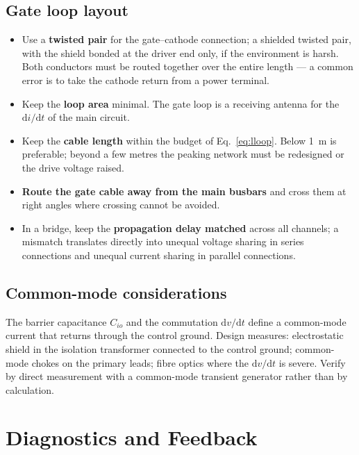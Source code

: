 \documentclass[11pt,a4paper]{article}
\begin{document}
\subsection{Gate loop layout}

\begin{itemize}
  \item Use a \textbf{twisted pair} for the gate--cathode connection; a shielded
        twisted pair, with the shield bonded at the driver end only, if the
        environment is harsh. Both conductors must be routed together over the
        entire length --- a common error is to take the cathode return from a power
        terminal.
  \item Keep the \textbf{loop area} minimal. The gate loop is a receiving antenna
        for the $\mathrm{d}i/\mathrm{d}t$ of the main circuit.
  \item Keep the \textbf{cable length} within the budget of
        Eq.~\eqref{eq:lloop}. Below \SI{1}{\metre} is preferable; beyond a few
        metres the peaking network must be redesigned or the drive voltage raised.
  \item \textbf{Route the gate cable away from the main busbars} and cross them at
        right angles where crossing cannot be avoided.
  \item In a bridge, keep the \textbf{propagation delay matched} across all
        channels; a mismatch translates directly into unequal voltage sharing in
        series connections and unequal current sharing in parallel connections.
\end{itemize}

\subsection{Common-mode considerations}

The barrier capacitance $C_{io}$ and the commutation $\mathrm{d}v/\mathrm{d}t$
define a common-mode current that returns through the control ground. Design
measures: electrostatic shield in the isolation transformer connected to the
control ground; common-mode chokes on the primary leads; fibre optics where the
$\mathrm{d}v/\mathrm{d}t$ is severe. Verify by direct measurement with a
common-mode transient generator rather than by calculation.

\section{Diagnostics and Feedback}
\end{document}
